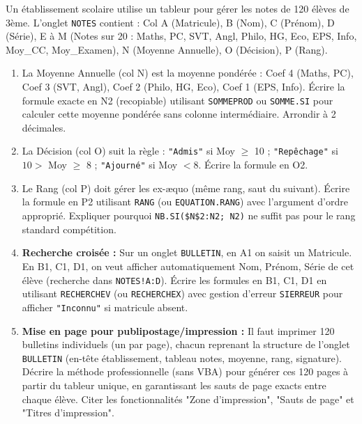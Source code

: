\documentclass[11pt]{article}
\begin{document}
\begin{exercice}
Un établissement scolaire utilise un tableur pour gérer les notes de 120 élèves de 3ème. L'onglet \texttt{NOTES} contient : Col A (Matricule), B (Nom), C (Prénom), D (Série), E à M (Notes sur 20 : Maths, PC, SVT, Angl, Philo, HG, Eco, EPS, Info, Moy\_CC, Moy\_Examen), N (Moyenne Annuelle), O (Décision), P (Rang).

\begin{enumerate}
    \item La Moyenne Annuelle (col N) est la moyenne pondérée : Coef 4 (Maths, PC), Coef 3 (SVT, Angl), Coef 2 (Philo, HG, Eco), Coef 1 (EPS, Info). Écrire la formule exacte en N2 (recopiable) utilisant \texttt{SOMMEPROD} ou \texttt{SOMME.SI} pour calculer cette moyenne pondérée sans colonne intermédiaire. Arrondir à 2 décimales.
    \item La Décision (col O) suit la règle : \texttt{"Admis"} si Moy $\ge$ 10 ; \texttt{"Repêchage"} si $10 >$ Moy $\ge$ 8 ; \texttt{"Ajourné"} si Moy $< 8$. Écrire la formule en O2.
    \item Le Rang (col P) doit gérer les ex-æquo (même rang, saut du suivant). Écrire la formule en P2 utilisant \texttt{RANG} (ou \texttt{EQUATION.RANG}) avec l'argument d'ordre approprié. Expliquer pourquoi \texttt{NB.SI(\$N\$2:N2; N2)} ne suffit pas pour le rang standard compétition.
    \item \textbf{Recherche croisée :} Sur un onglet \texttt{BULLETIN}, en A1 on saisit un Matricule. En B1, C1, D1, on veut afficher automatiquement Nom, Prénom, Série de cet élève (recherche dans \texttt{NOTES!A:D}). Écrire les formules en B1, C1, D1 en utilisant \texttt{RECHERCHEV} (ou \texttt{RECHERCHEX}) avec gestion d'erreur \texttt{SIERREUR} pour afficher \texttt{"Inconnu"} si matricule absent.
    \item \textbf{Mise en page pour publipostage/impression :} Il faut imprimer 120 bulletins individuels (un par page), chacun reprenant la structure de l'onglet \texttt{BULLETIN} (en-tête établissement, tableau notes, moyenne, rang, signature). Décrire la méthode professionnelle (sans VBA) pour générer ces 120 pages à partir du tableur unique, en garantissant les sauts de page exacts entre chaque élève. Citer les fonctionnalités "Zone d'impression", "Sauts de page" et "Titres d'impression".
\end{enumerate}
\end{exercice}
\end{document}
